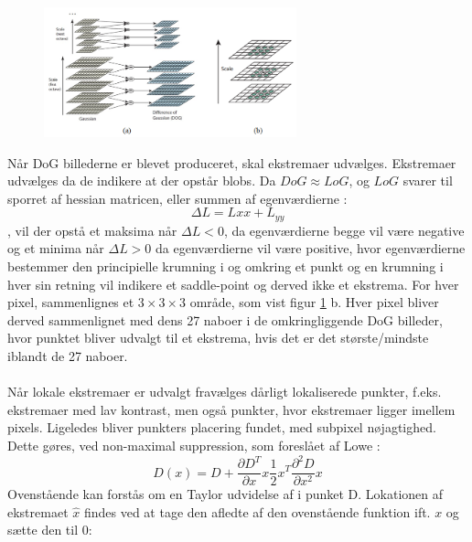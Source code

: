 \begin{figure}[H]
    \centering
    \includegraphics[width=0.65\textwidth]{fig/30.png}
     \vspace{-1em}
    \begin{center}    
       \caption{\textcolor{gray}{\footnotesize \textit{ }}}
    \label{fig:difference}
     \end{center}
     \vspace{-2.5em}
  \end{figure} \noindent
Når DoG billederne er blevet produceret, skal ekstremaer udvælges. Ekstremaer udvælges da de indikere at der opstår blobs. Da $DoG \approx LoG$, og $LoG$ svarer til sporret af hessian matricen, eller summen af egenværdierne :$$\Delta L = L{xx}+L_{yy} $$, vil der opstå et maksima når $\Delta L<0$, da egenværdierne begge vil være negative og et minima når $\Delta L > 0$ da egenværdierne vil være positive, hvor egenværdierne bestemmer den principielle krumning i og omkring et punkt og en krumning i hver sin retning vil indikere et saddle-point og derved ikke et ekstrema.
For hver pixel, sammenlignes et $3\times3\times3$ område, som vist figur \ref{fig:difference} b. Hver pixel bliver derved sammenlignet med dens 27 naboer i de omkringliggende DoG billeder, hvor punktet bliver udvalgt til et ekstrema, hvis det er det største/mindste iblandt de 27 naboer. 
\\
\\
Når lokale ekstremaer er udvalgt fravælges dårligt lokaliserede punkter, f.eks. ekstremaer med lav kontrast, men også punkter, hvor ekstremaer ligger imellem pixels. Ligeledes bliver punkters placering fundet, med subpixel nøjagtighed. Dette gøres, ved non-maximal suppression, som foreslået af Lowe \cite{nonmaximalsuppression}:
\begin{equation}
D(x)=D+\dfrac{\partial D^T}{\partial x}x\dfrac{1}{2}x^T\dfrac{\partial^2D}{\partial x^2}x
\label{nonmax}
\end{equation}
Ovenstående kan forstås om en Taylor udvidelse af i punket D.
Lokationen af ekstremaet $\hat{x}$ findes ved at tage den afledte af den ovenstående funktion ift. $x$ og sætte den til 0:
